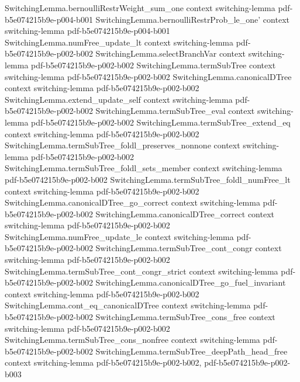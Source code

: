 \begin{theorem}
\proofstep
  {SwitchingLemma.bernoulliRestrWeight_sum_one}
  {context}
  {switching-lemma}
  {pdf-b5e074215b9e-p004-b001}
\proofstep
  {SwitchingLemma.bernoulliRestrProb_le_one'}
  {context}
  {switching-lemma}
  {pdf-b5e074215b9e-p004-b001}
\proofstep
  {SwitchingLemma.numFree_update_lt}
  {context}
  {switching-lemma}
  {pdf-b5e074215b9e-p002-b002}
\proofstep
  {SwitchingLemma.selectBranchVar}
  {context}
  {switching-lemma}
  {pdf-b5e074215b9e-p002-b002}
\proofstep
  {SwitchingLemma.termSubTree}
  {context}
  {switching-lemma}
  {pdf-b5e074215b9e-p002-b002}
\proofstep
  {SwitchingLemma.canonicalDTree}
  {context}
  {switching-lemma}
  {pdf-b5e074215b9e-p002-b002}
\proofstep
  {SwitchingLemma.extend_update_self}
  {context}
  {switching-lemma}
  {pdf-b5e074215b9e-p002-b002}
\proofstep
  {SwitchingLemma.termSubTree_eval}
  {context}
  {switching-lemma}
  {pdf-b5e074215b9e-p002-b002}
\proofstep
  {SwitchingLemma.termSubTree_extend_eq}
  {context}
  {switching-lemma}
  {pdf-b5e074215b9e-p002-b002}
\proofstep
  {SwitchingLemma.termSubTree_foldl_preserves_nonnone}
  {context}
  {switching-lemma}
  {pdf-b5e074215b9e-p002-b002}
\proofstep
  {SwitchingLemma.termSubTree_foldl_sets_member}
  {context}
  {switching-lemma}
  {pdf-b5e074215b9e-p002-b002}
\proofstep
  {SwitchingLemma.termSubTree_foldl_numFree_lt}
  {context}
  {switching-lemma}
  {pdf-b5e074215b9e-p002-b002}
\proofstep
  {SwitchingLemma.canonicalDTree_go_correct}
  {context}
  {switching-lemma}
  {pdf-b5e074215b9e-p002-b002}
\proofstep
  {SwitchingLemma.canonicalDTree_correct}
  {context}
  {switching-lemma}
  {pdf-b5e074215b9e-p002-b002}
\proofstep
  {SwitchingLemma.numFree_update_le}
  {context}
  {switching-lemma}
  {pdf-b5e074215b9e-p002-b002}
\proofstep
  {SwitchingLemma.termSubTree_cont_congr}
  {context}
  {switching-lemma}
  {pdf-b5e074215b9e-p002-b002}
\proofstep
  {SwitchingLemma.termSubTree_cont_congr_strict}
  {context}
  {switching-lemma}
  {pdf-b5e074215b9e-p002-b002}
\proofstep
  {SwitchingLemma.canonicalDTree_go_fuel_invariant}
  {context}
  {switching-lemma}
  {pdf-b5e074215b9e-p002-b002}
\proofstep
  {SwitchingLemma.cont_eq_canonicalDTree}
  {context}
  {switching-lemma}
  {pdf-b5e074215b9e-p002-b002}
\proofstep
  {SwitchingLemma.termSubTree_cons_free}
  {context}
  {switching-lemma}
  {pdf-b5e074215b9e-p002-b002}
\proofstep
  {SwitchingLemma.termSubTree_cons_nonfree}
  {context}
  {switching-lemma}
  {pdf-b5e074215b9e-p002-b002}
\proofstep
  {SwitchingLemma.termSubTree_deepPath_head_free}
  {context}
  {switching-lemma}
  {pdf-b5e074215b9e-p002-b002,
    pdf-b5e074215b9e-p002-b003}

\end{theorem}

